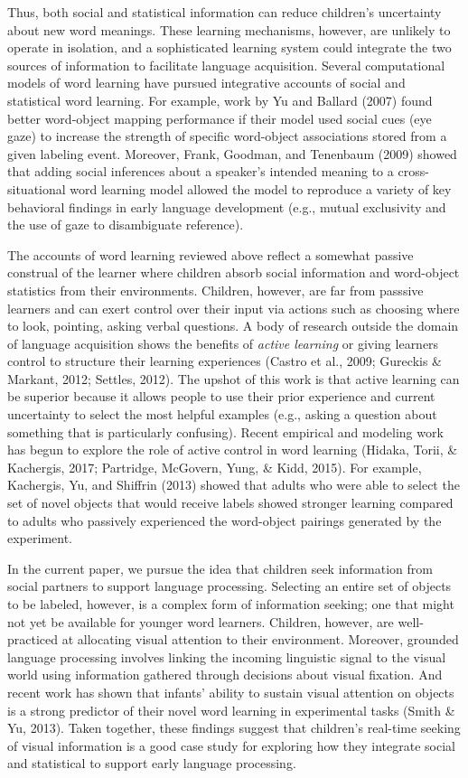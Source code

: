 \documentclass[man,floatsintext]{apa6}
\begin{document}
Thus, both social and statistical information can reduce children's
uncertainty about new word meanings. These learning mechanisms, however,
are unlikely to operate in isolation, and a sophisticated learning
system could integrate the two sources of information to facilitate
language acquisition. Several computational models of word learning have
pursued integrative accounts of social and statistical word learning.
For example, work by Yu and Ballard (2007) found better word-object
mapping performance if their model used social cues (eye gaze) to
increase the strength of specific word-object associations stored from a
given labeling event. Moreover, Frank, Goodman, and Tenenbaum (2009)
showed that adding social inferences about a speaker's intended meaning
to a cross-situational word learning model allowed the model to
reproduce a variety of key behavioral findings in early language
development (e.g., mutual exclusivity and the use of gaze to
disambiguate reference).

The accounts of word learning reviewed above reflect a somewhat passive
construal of the learner where children absorb social information and
word-object statistics from their environments. Children, however, are
far from passsive learners and can exert control over their input via
actions such as choosing where to look, pointing, asking verbal
questions. A body of research outside the domain of language acquisition
shows the benefits of \emph{active learning} or giving learners control
to structure their learning experiences (Castro et al., 2009; Gureckis
\& Markant, 2012; Settles, 2012). The upshot of this work is that active
learning can be superior because it allows people to use their prior
experience and current uncertainty to select the most helpful examples
(e.g., asking a question about something that is particularly
confusing). Recent empirical and modeling work has begun to explore the
role of active control in word learning (Hidaka, Torii, \& Kachergis,
2017; Partridge, McGovern, Yung, \& Kidd, 2015). For example, Kachergis,
Yu, and Shiffrin (2013) showed that adults who were able to select the
set of novel objects that would receive labels showed stronger learning
compared to adults who passively experienced the word-object pairings
generated by the experiment.

In the current paper, we pursue the idea that children seek information
from social partners to support language processing. Selecting an entire
set of objects to be labeled, however, is a complex form of information
seeking; one that might not yet be available for younger word learners.
Children, however, are well-practiced at allocating visual attention to
their environment. Moreover, grounded language processing involves
linking the incoming linguistic signal to the visual world using
information gathered through decisions about visual fixation. And recent
work has shown that infants' ability to sustain visual attention on
objects is a strong predictor of their novel word learning in
experimental tasks (Smith \& Yu, 2013). Taken together, these findings
suggest that children's real-time seeking of visual information is a
good case study for exploring how they integrate social and statistical
to support early language processing.
\end{document}
